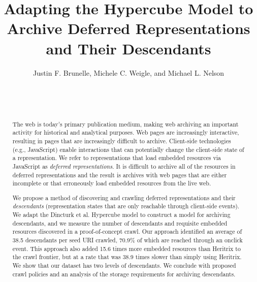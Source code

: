 \documentclass{sig-alternate}
\begin{document}
\title{Adapting the Hypercube Model to Archive Deferred Representations and Their Descendants}





\author{
\alignauthor
Justin F. Brunelle, Michele C. Weigle, and Michael L. Nelson\\
       \\
       \\
       \\
}




\maketitle
\begin{abstract}
The web is today’s primary publication medium, making
web archiving an important activity for historical and analytical
purposes. Web pages are increasingly interactive,
resulting in pages that are increasingly difficult to archive.
Client-side technologies (e.g., JavaScript) enable interactions
that can potentially change the client-side state of a representation.
We refer to representations that load embedded
resources via JavaScript as \emph{deferred representations}. It is
difficult to archive all of the resources in deferred representations
and the result is archives with web pages that
are either incomplete or that erroneously load embedded resources
from the live web.

We propose a method of discovering and crawling deferred
representations and their \emph{descendants} (representation states
that are only reachable through client-side events). We
adapt the Dincturk et al. Hypercube model to construct a
model for archiving descendants, and we measure the number
of descendants and requisite embedded resources discovered
in a proof-of-concept crawl. Our approach identified an
average of 38.5 descendants per seed URI crawled, 70.9\% of
which are reached through an onclick event. This approach
also added 15.6 times more embedded resources than Heritrix
to the crawl frontier, but at a rate that was 38.9 times
slower than simply using Heritrix. We show that our dataset
has two levels of descendants. We conclude with proposed
crawl policies and an analysis of the storage requirements
for archiving descendants.

\end{abstract}
\end{document}
